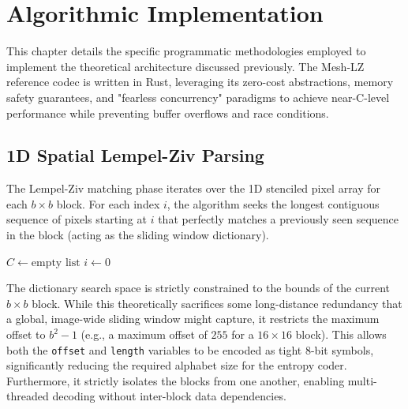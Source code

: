 \chapter{Algorithmic Implementation}
\label{ch:algorithms}

This chapter details the specific programmatic methodologies employed to implement the theoretical architecture discussed previously. The Mesh-LZ reference codec is written in Rust, leveraging its zero-cost abstractions, memory safety guarantees, and "fearless concurrency" paradigms to achieve near-C-level performance while preventing buffer overflows and race conditions.

\section{1D Spatial Lempel-Ziv Parsing}

The Lempel-Ziv matching phase iterates over the 1D stenciled pixel array for each $b \times b$ block. For each index $i$, the algorithm seeks the longest contiguous sequence of pixels starting at $i$ that perfectly matches a previously seen sequence in the block (acting as the sliding window dictionary).

\begin{algorithm}[H]
\SetAlgoLined
{}
 $C \gets \text{empty list}$\;
 $i \gets 0$\;
 \;
 \caption{Greedy Lempel-Ziv Block Matcher}
\end{algorithm}

The dictionary search space is strictly constrained to the bounds of the current $b \times b$ block. While this theoretically sacrifices some long-distance redundancy that a global, image-wide sliding window might capture, it restricts the maximum offset to $b^2 - 1$ (e.g., a maximum offset of $255$ for a $16 \times 16$ block). This allows both the \texttt{offset} and \texttt{length} variables to be encoded as tight 8-bit symbols, significantly reducing the required alphabet size for the entropy coder. Furthermore, it strictly isolates the blocks from one another, enabling multi-threaded decoding without inter-block data dependencies.

